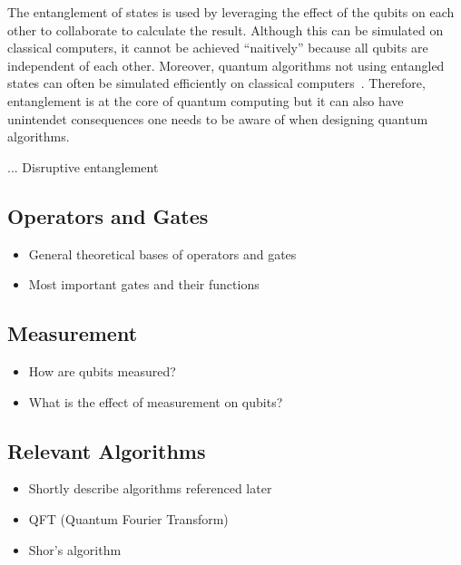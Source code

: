 The entanglement of states is used by leveraging the effect of the qubits on each other to collaborate to calculate the result. Although this can be simulated on classical computers, it cannot be achieved ``naitively'' because all qubits are independent of each other. Moreover, quantum algorithms not using entangled states can often be simulated efficiently on classical computers~\cite{MHH19}. Therefore, entanglement is at the core of quantum computing but it can also have unintendet consequences one needs to be aware of when designing quantum algorithms.

... Disruptive entanglement

\subsection{Operators and Gates}
\begin{itemize}
    \item General theoretical bases of operators and gates
    \item Most important gates and their functions
\end{itemize}

\subsection{Measurement}
\begin{itemize}
    \item How are qubits measured?
    \item What is the effect of measurement on qubits?
\end{itemize}

\subsection{Relevant Algorithms}
\begin{itemize}
    \item Shortly describe algorithms referenced later
    \item QFT (Quantum Fourier Transform) 
    \item Shor's algorithm 
\end{itemize}